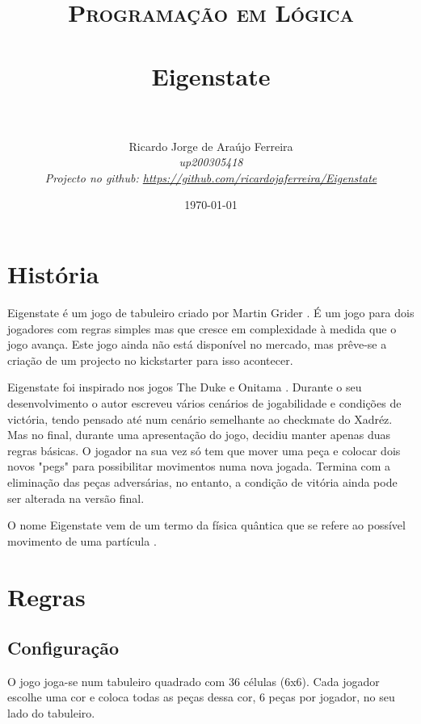 \documentclass[paper=a4, fontsize=11pt]{scrartcl} %
\title{	
\normalfont \normalsize 
\textsc{Programação em Lógica} \\ [25pt] %
\horrule{0.5pt} \\[0.4cm] %
\huge Eigenstate \\ %
\horrule{2pt} \\[0.5cm] %
}
\author{
	Ricardo Jorge de Araújo Ferreira\\
	\normalsize\itshape up200305418\\
	\small Projecto no github: \url{https://github.com/ricardojaferreira/Eigenstate}
} %
\date{\normalsize\today} %
\numberwithin{equation}{section} %
\numberwithin{figure}{section} %
\numberwithin{table}{section} %
\begin{document}
\maketitle %


\section{História}

Eigenstate é um jogo de tabuleiro criado por Martin Grider \cite{GameGeek:2018}. É um jogo para dois jogadores com regras simples mas que cresce em complexidade à medida que o jogo avança. Este jogo ainda não está disponível no mercado, mas prêve-se a criação de um projecto no kickstarter para isso acontecer.

Eigenstate foi inspirado nos jogos The Duke \cite{TheDuke:2013} e Onitama \cite{Onitama:2014}. Durante o seu desenvolvimento o autor escreveu vários cenários de jogabilidade e condições de victória, tendo pensado até num cenário semelhante ao checkmate do Xadréz. Mas no final, durante uma apresentação do jogo, decidiu manter apenas duas regras básicas. O jogador na sua vez só tem que mover uma peça e colocar dois novos "pegs" para possibilitar movimentos numa nova jogada. Termina com a eliminação das peças adversárias, no entanto, a condição de vitória ainda pode ser alterada na versão final.

O nome Eigenstate vem de um termo da física quântica que se refere ao possível movimento de uma partícula \cite{Chesstris:2018}.


\section{Regras}

\subsection{Configuração}

O jogo joga-se num tabuleiro quadrado com 36 células (6x6). Cada jogador escolhe uma cor e coloca todas as peças dessa cor, 6 peças por jogador, no seu lado do tabuleiro.
\end{document}
